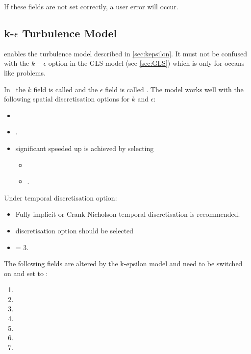 If these fields are not set correctly, a user error will occur.

\subsection{k-$\epsilon$ Turbulence Model}\label{sec:kepsilon_usage}

 enables the turbulence model
described in \ref{sec:kepsilon}. It must not be confused with the $k-\epsilon$ option in
the GLS model (see \ref{sec:GLS}) which is only for oceans like problems.

In \fluidity\ the $k$ field is called  and the $\epsilon$
field is called .  The model works well with the following
spatial discretisation options for $k$ and $\epsilon$:
\begin{itemize}
\item
\item {}.
\item significant speeded up is achieved by selecting
  \begin{itemize}
  \item {}
  \item {}.
  \end{itemize}
\end{itemize}

Under temporal discretisation option:
\begin{itemize}
\item Fully implicit or Crank-Nicholson temporal discretisation is recommended.
\item {} discretisation option should be selected
\item {} = 3.
\end{itemize}

The following fields are altered by the k-epsilon model and need to be switched on and set
to :
\begin{enumerate}
\item {}
\item {}
\item {}
\item {}
\item {}
\item {}
\item {}
\end{enumerate}

